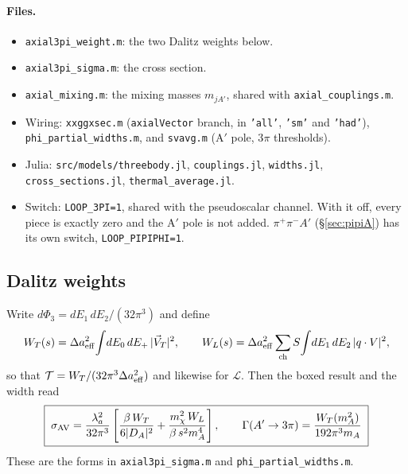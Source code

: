 \documentclass{article}
\newcommand{\Da}{\Delta a}
\begin{document}
\paragraph{Files.}
\begin{itemize}
\item \texttt{axial3pi\_weight.m}: the two Dalitz weights below.
\item \texttt{axial3pi\_sigma.m}: the cross section.
\item \texttt{axial\_mixing.m}: the mixing masses $m_{jA'}$, shared with \texttt{axial\_couplings.m}.
\item Wiring: \texttt{xxggxsec.m} (\texttt{axialVector} branch, in \texttt{'all'}, \texttt{'sm'}
  and \texttt{'had'}), \texttt{phi\_partial\_widths.m}, and \texttt{svavg.m} (A$'$ pole,
  3$\pi$ thresholds).
\item Julia: \texttt{src/models/threebody.jl}, \texttt{couplings.jl}, \texttt{widths.jl},
  \texttt{cross\_sections.jl}, \texttt{thermal\_average.jl}.
\item Switch: \texttt{LOOP\_3PI=1}, shared with the pseudoscalar channel. With it off, every piece
  is exactly zero and the A$'$ pole is not added. $\pi^+\pi^-A'$ (\S\ref{sec:pipiA}) has its own
  switch, \texttt{LOOP\_PIPIPHI=1}.
\end{itemize}

\subsection{Dalitz weights}

Write $d\Phi_3=dE_1\,dE_2/(32\pi^3)$ and define
\begin{equation}
  W_T(s)=\Da_{\rm eff}^2\!\int\!dE_0\,dE_+\,|\vec V_T|^2,\qquad
  W_L(s)=\Da_{\rm eff}^2\sum_{\rm ch}S\!\int\!dE_1\,dE_2\,|q\cdot V|^2,
\end{equation}
so that $\mathcal T=W_T/(32\pi^3\Da_{\rm eff}^2)$ and likewise for $\mathcal L$. Then the boxed
result and the width read
\begin{equation}
  \boxed{\;\sigma_{\rm AV}=\frac{\lambda_a^2}{32\pi^3}\left[\frac{\beta\,W_T}{6|D_A|^2}
  +\frac{m_\chi^2\,W_L}{\beta\,s^2m_A^4}\right],\qquad
  \Gamma(A'\to3\pi)=\frac{W_T(m_A^2)}{192\pi^3m_A}\;}
\end{equation}
These are the forms in \texttt{axial3pi\_sigma.m} and \texttt{phi\_partial\_widths.m}.
\end{document}
